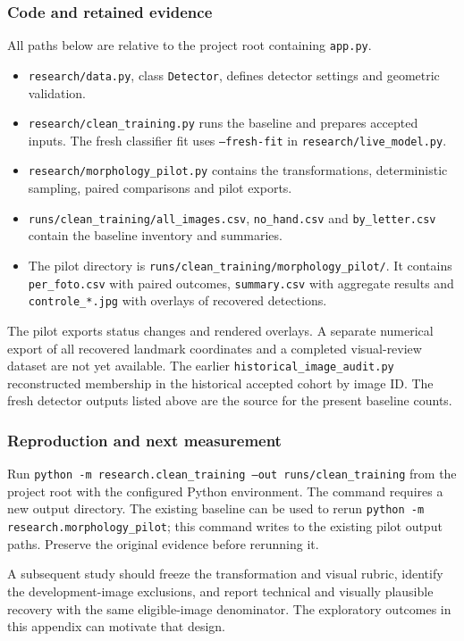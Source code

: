 \subsubsection{Code and retained evidence}
All paths below are relative to the project root containing \texttt{app.py}.
\begin{itemize}
\item \texttt{research/data.py}, class \texttt{Detector}, defines detector settings and geometric validation.
\item \texttt{research/clean\_training.py} runs the baseline and prepares accepted inputs. The fresh classifier fit uses \texttt{--fresh-fit} in \texttt{research/live\_model.py}.
\item \texttt{research/morphology\_pilot.py} contains the transformations, deterministic sampling, paired comparisons and pilot exports.
\item \texttt{runs/clean\_training/all\_images.csv}, \texttt{no\_hand.csv} and \texttt{by\_letter.csv} contain the baseline inventory and summaries.
\item The pilot directory is \texttt{runs/clean\_training/morphology\_pilot/}. It contains \texttt{per\_foto.csv} with paired outcomes, \texttt{summary.csv} with aggregate results and \texttt{controle\_*.jpg} with overlays of recovered detections.
\end{itemize}

The pilot exports status changes and rendered overlays. A separate numerical export of all recovered landmark coordinates and a completed visual-review dataset are not yet available. The earlier \texttt{historical\_image\_audit.py} reconstructed membership in the historical accepted cohort by image ID. The fresh detector outputs listed above are the source for the present baseline counts.

\subsubsection{Reproduction and next measurement}
Run \texttt{python -m research.clean\_training --out runs/clean\_training}
from the project root with the configured Python environment. The command requires a new output directory. The existing baseline can be used to rerun \texttt{python -m research.morphology\_pilot}; this command writes to the existing pilot output paths. Preserve the original evidence before rerunning it.

A subsequent study should freeze the transformation and visual rubric, identify the development-image exclusions, and report technical and visually plausible recovery with the same eligible-image denominator. The exploratory outcomes in this appendix can motivate that design.